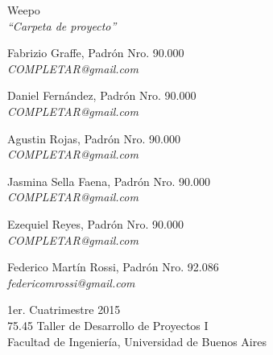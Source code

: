 \documentclass[oneside]{book}
\begin{document}

\thispagestyle{empty}



\begin{titlepage}
	\vspace*{\fill}
	\begin{center}
		\Huge{Weepo} \\
		\medskip
		\huge \textit{``Carpeta de proyecto''} \\
		
		\bigskip\bigskip\bigskip\bigskip\bigskip\bigskip

		\Large Fabrizio Graffe, Padrón Nro. 90.000 \\
		\large \textit{COMPLETAR@gmail.com} \\ \medskip
		
		\Large Daniel Fernández, Padrón Nro. 90.000 \\
		\large \textit{COMPLETAR@gmail.com} \\ \medskip
		
		\Large Agustin Rojas, Padrón Nro. 90.000 \\
		\large \textit{COMPLETAR@gmail.com} \\ \medskip

		\Large Jasmina Sella Faena, Padrón Nro. 90.000 \\
		\large \textit{COMPLETAR@gmail.com} \\ \medskip

		\Large Ezequiel Reyes, Padrón Nro. 90.000 \\
		\large \textit{COMPLETAR@gmail.com} \\ \medskip
		
		\Large Federico Martín Rossi, Padrón Nro. 92.086 \\
		\large \textit{federicomrossi@gmail.com} \\

		\bigskip\bigskip\bigskip\bigskip\bigskip\bigskip

		\large 1er. Cuatrimestre 2015 \\ \smallskip
		\large 75.45 Taller de Desarrollo de Proyectos I \\ \smallskip
		\large Facultad de Ingeniería, Universidad de Buenos Aires \\ \smallskip

		\date{}
	\end{center}
	\vspace*{\fill}
\end{titlepage}
\end{document}
